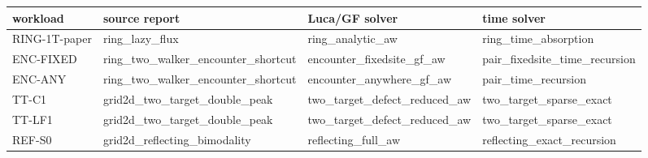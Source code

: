 \begin{tabular}{llll}
\toprule
workload & source report & Luca/GF solver & time solver \\
\midrule
RING-1T-paper & ring\_lazy\_flux & ring\_analytic\_aw & ring\_time\_absorption \\
ENC-FIXED & ring\_two\_walker\_encounter\_shortcut & encounter\_fixedsite\_gf\_aw & pair\_fixedsite\_time\_recursion \\
ENC-ANY & ring\_two\_walker\_encounter\_shortcut & encounter\_anywhere\_gf\_aw & pair\_time\_recursion \\
TT-C1 & grid2d\_two\_target\_double\_peak & two\_target\_defect\_reduced\_aw & two\_target\_sparse\_exact \\
TT-LF1 & grid2d\_two\_target\_double\_peak & two\_target\_defect\_reduced\_aw & two\_target\_sparse\_exact \\
REF-S0 & grid2d\_reflecting\_bimodality & reflecting\_full\_aw & reflecting\_exact\_recursion \\
\bottomrule
\end{tabular}
